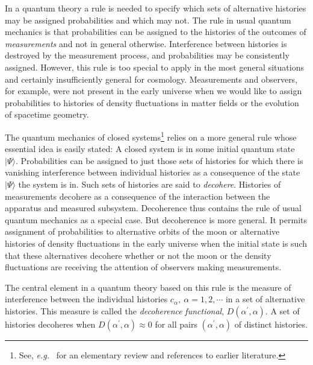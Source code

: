 In a quantum theory a rule is needed to specify which sets
of alternative histories may be assigned probabilities and which may
not.  The rule in usual quantum mechanics is that probabilities can be
assigned to the histories of the outcomes of {\it measurements} and not
in general otherwise.  Interference between histories is destroyed by
the measurement process, and probabilities may be consistently assigned.
However, this rule is too special to apply in the most general
situations and certainly insufficiently general for cosmology.
Measurements and observers, for example, were not present in the early
universe when we would like to assign probabilities to histories of
density fluctuations in matter fields or the evolution of spacetime
geometry.

The quantum mechanics of closed systems\footnote{See, {\it e.g.}~\cite{Har93a}
for an elementary review and references to earlier literature.}
 relies on a more general rule
whose essential idea is easily stated: A closed system is in some
initial quantum state $|\Psi\rangle$. Probabilities can be assigned to
just those sets of histories for which there is vanishing interference
between individual histories
as a consequence of the state $|\Psi\rangle$ the system is in.
Such sets of histories are said to {\it decohere}. Histories of
measurements decohere as a consequence of the interaction between the
apparatus and measured subsystem. Decoherence thus contains the rule of
usual quantum mechanics as a special case.  But decoherence is more
general.  It permits assignment of probabilities to alternative orbits
of the moon or alternative histories of density fluctuations in the
early universe when the initial state is such that these alternatives
decohere whether or not the moon or the density fluctuations
are receiving the attention of observers
making measurements.

The central element in a quantum theory based on this rule is the
measure of interference between the individual histories
$c_\alpha, \ \alpha=1,2,\cdots$ in a set of alternative histories.  This measure is
called the {\it decoherence} {\it functional},
$D(\alpha^\prime,\alpha)$. A set of histories decoheres when
$D(\alpha^\prime,\alpha) \approx0$ for all pairs
$(\alpha^\prime,\alpha)$ of distinct histories.

